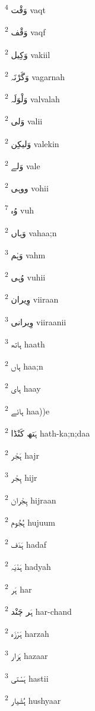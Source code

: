 \documentclass[12pt]{article}
\begin{document}
\begin{multicols}{5}
{\ur وَقْت}   \textsuperscript{4} vaqt

{\ur وَقْف}   \textsuperscript{2} vaqf

{\ur وَکِیل}   \textsuperscript{2} vakiil

{\ur وَگَرْنَہ}   \textsuperscript{2} vagarnah

{\ur وَلْوَلَہ}   \textsuperscript{2} valvalah

{\ur وَلی}   \textsuperscript{2} valii

{\ur وَلیکِن}   \textsuperscript{2} valekin

{\ur وَلے}   \textsuperscript{2} vale

{\ur ووہی}   \textsuperscript{2} vohii

{\ur وُہ}   \textsuperscript{7} vuh

{\ur وَہاں}   \textsuperscript{2} vahaa;n

{\ur وَہْم}   \textsuperscript{3} vahm

{\ur وُہی}   \textsuperscript{2} vuhii

{\ur وِیران}   \textsuperscript{2} viiraan

{\ur وِیرانی}   \textsuperscript{3} viiraanii

{\ur ہاتھ}   \textsuperscript{3} haath

{\ur ہاں}   \textsuperscript{2} haa;n

{\ur ہای}   \textsuperscript{2} haay

{\ur ہائے}   \textsuperscript{2} haa))e

{\ur ہَتھ کَنْڈا}   \textsuperscript{2} hath-ka;n;daa

{\ur ہَجْر}   \textsuperscript{2} hajr

{\ur ہِجْر}   \textsuperscript{3} hijr

{\ur ہِجْران}   \textsuperscript{2} hijraan

{\ur ہُجُوم}   \textsuperscript{2} hujuum

{\ur ہَدَف}   \textsuperscript{2} hadaf

{\ur ہَدْیَہ}   \textsuperscript{2} hadyah

{\ur ہَر}   \textsuperscript{2} har

{\ur ہَر چَنْد}   \textsuperscript{2} har-chand

{\ur ہَرْزَہ}   \textsuperscript{2} harzah

{\ur ہَزار}   \textsuperscript{3} hazaar

{\ur ہَسْتی}   \textsuperscript{3} hastii

{\ur ہُشْیار}   \textsuperscript{2} hushyaar


\end{multicols}
\end{document}
